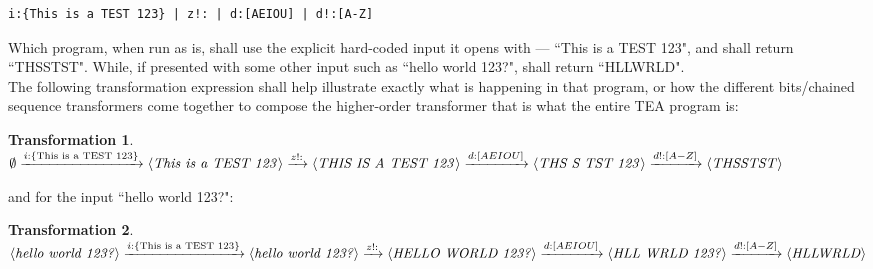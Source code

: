 \documentclass[a4paper, 18pt]{book} %
\newtheorem{trans}{Transformation}
\begin{document}
\begin{appendices}
  \begin{tcolorbox}[teaterminalstyle, title=TEA Program: CONSONANT FILTER, breakable]
    \begin{lstlisting}[language=TEA,breaklines=true,label={LSTCONSFIL},caption=CF in TEA]
i:{This is a TEST 123} | z!: | d:[AEIOU] | d!:[A-Z]
   \end{lstlisting}
  \end{tcolorbox}
  \vspace{2em}
 
 Which program, when run as is, shall use the explicit hard-coded input it opens with --- ``This is a TEST 123", and shall return ``THSSTST". While, if presented with some other input such as ``hello world 123?", shall return ``HLLWRLD".\\
 
The following transformation expression shall help illustrate exactly what is happening in that program, or how the different bits/chained sequence transformers come together to compose the higher-order transformer that is what the entire TEA program is:
 
 \vspace{1em}
\begin{trans}
$\emptyset \xrightarrow{i:\{\text{This is a TEST 123}\}} \langle \text{\textit{This is a TEST 123}} \rangle \xrightarrow{z!:} \langle \text{\textit{THIS IS A TEST 123}} \rangle \xrightarrow{d:[AEIOU]} \langle \text{\textit{THS S  TST 123}} \rangle \xrightarrow{d!:[A-Z]} \langle \text{\textit{THSSTST}} \rangle$\\
\end{trans} 
\vspace{1em}
 
 
 and for the input ``hello world 123?":
 
 \vspace{1em}
 \begin{trans}
 \label{TRANSTEAPROGb}
$\langle \text{\textit{hello world 123?}} \rangle \xrightarrow{i:\{\text{This is a TEST 123}\}} \langle \text{\textit{hello world 123?}} \rangle \xrightarrow{z!:} \langle \text{\textit{HELLO WORLD 123?}} \rangle \xrightarrow{d:[AEIOU]} \langle \text{\textit{HLL WRLD 123?}} \rangle \xrightarrow{d!:[A-Z]} \langle \text{\textit{HLLWRLD}} \rangle$
\end{trans} 
\vspace{1em}
 

\end{appendices}
\end{document}
